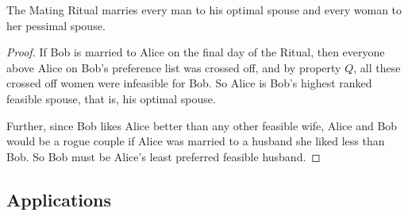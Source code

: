 \begin{theorem}\label{boyopt}
The Mating Ritual marries every man to his optimal spouse and every
woman to her pessimal spouse.
\end{theorem}

\begin{proof}
If Bob is married to Alice on the final day of the Ritual, then
everyone above Alice on Bob's preference list was crossed off, and by
property $Q$, all these crossed off women were infeasible for Bob.  So
Alice is Bob's highest ranked feasible spouse, that is, his optimal
spouse.

Further, since Bob likes Alice better than any other feasible wife,
Alice and Bob would be a rogue couple if Alice was married to a
husband she liked less than Bob.  So Bob must be Alice's least
preferred feasible husband.
\end{proof}

\iffalse

Suppose some man Bob is married to some women Alice in a stable
set of marriages.  If there is another 
which Bob is \emph{not} married to Alice, then Bob prefers his new
spouse to Alice iff Alice prefers Bob to her new spouse.

\begin{proof}
Assume for the sake of contradiction that the theorem is not true.
Hence, there must be a stable set of marriages~$\mathcal{M}$ where some
woman (call her Nicole) is married to a man (call him Tom) that she
likes less than her spouse in The Mating Ritual (call him Keith).
This means that
\begin{equation}
\text{Nicole prefers Keith to Tom.} \tag{+}
\end{equation}

By Theorem~\ref{boyopt} and the fact that Nicole and Keith are married
in the Mating Ritual, we know that 
\begin{equation}\tag{++}
\text{Keith prefers Nicole to his spouse in~$\mathcal{M}$.}
\end{equation}
This means that Keith and Nicole form a rogue couple in~$\mathcal{M}$,
which contradicts the stability of~$\mathcal{M}$.
\end{proof}
\fi

\subsection{Applications}

